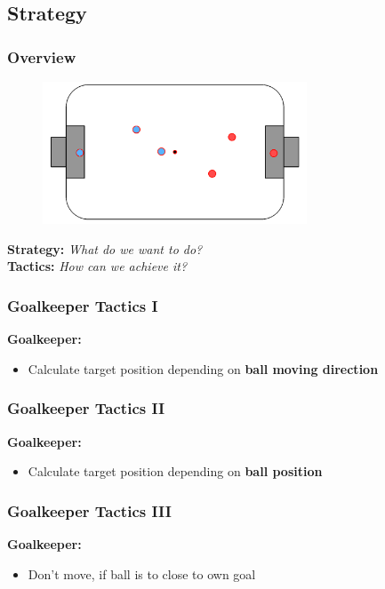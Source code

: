 \documentclass[hyperref={pdfpagelabels=false},compress]{beamer}
\begin{document}
\subsection{Strategy}
\begin{frame}
    \frametitle{Overview}
    \begin{figure}
        \includegraphics[width=0.7\textwidth]{Pictures/strategy}
    \end{figure}
    \textbf{Strategy:} \textit{What do we want to do?}\\
    \textbf{Tactics:} \textit{How can we achieve it?}
\end{frame}

\begin{frame}
		\frametitle{Goalkeeper Tactics I}
		\textbf{Goalkeeper:}\\
		\begin{itemize}
				\item Calculate target position depending on \textbf{ball moving direction}\\
		\end{itemize}
		\begin{center}
				
		\end{center}
\end{frame}

\begin{frame}
    \frametitle{Goalkeeper Tactics II}
    \textbf{Goalkeeper:}\\
    \begin{itemize}
        \item Calculate target position depending on \textbf{ball position}\\
    \end{itemize}
    \begin{center}
        
    \end{center}
\end{frame}

\begin{frame}
		\frametitle{Goalkeeper Tactics III}
		\textbf{Goalkeeper:}\\
		\begin{itemize}
				\item Don't move, if ball is to close to own goal\\
		\end{itemize}
		\begin{center}
				
		\end{center}
\end{frame}
\end{document}
